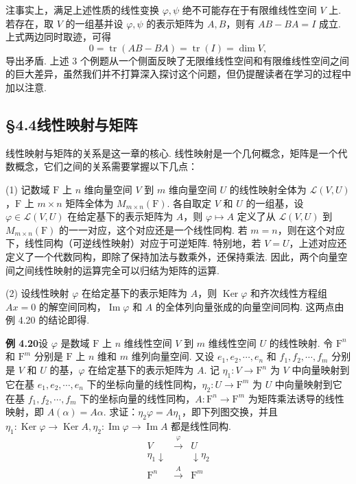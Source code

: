 \documentclass[UTF8,12pt,a4paper,fontset=fandol]{ctexart}
\begin{document}
注\quad 事实上，满足上述性质的线性变换 $\varphi,\psi$ 绝不可能存在于有限维线性空间 $V$ 上. 若存在，取 $V$ 的一组基并设 $\varphi,\psi$ 的表示矩阵为 $A,B$，则有 $AB-BA=I$ 成立. 上式两边同时取迹，可得
\[
0=\operatorname{tr}(AB-BA)=\operatorname{tr}(I)=\dim V,
\]
导出矛盾. 上述 3 个例题从一个侧面反映了无限维线性空间和有限维线性空间之间的巨大差异，虽然我们并不打算深入探讨这个问题，但仍提醒读者在学习的过程中加以注意.

\subsection*{§4.4\quad 线性映射与矩阵}

线性映射与矩阵的关系是这一章的核心. 线性映射是一个几何概念，矩阵是一个代数概念，它们之间的关系需要掌握以下几点：

(1) 记数域 $\mathrm{F}$ 上 $n$ 维向量空间 $V$ 到 $m$ 维向量空间 $U$ 的线性映射全体为 $\mathcal{L}(V,U)$，$\mathrm{F}$ 上 $m\times n$ 矩阵全体为 $M_{m\times n}(\mathrm{F})$. 各自取定 $V$ 和 $U$ 的一组基，设 $\varphi\in\mathcal{L}(V,U)$ 在给定基下的表示矩阵为 $A$，则 $\varphi\mapsto A$ 定义了从 $\mathcal{L}(V,U)$ 到 $M_{m\times n}(\mathrm{F})$ 的一一对应，这个对应还是一个线性同构. 若 $m=n$，则在这个对应下，线性同构（可逆线性映射）对应于可逆矩阵. 特别地，若 $V=U$，上述对应还定义了一个代数同构，即除了保持加法与数乘外，还保持乘法. 因此，两个向量空间之间线性映射的运算完全可以归结为矩阵的运算.

(2) 设线性映射 $\varphi$ 在给定基下的表示矩阵为 $A$，则 $\operatorname{Ker}\varphi$ 和齐次线性方程组 $Ax=0$ 的解空间同构，$\operatorname{Im}\varphi$ 和 $A$ 的全体列向量张成的向量空间同构. 这两点由例 4.20 的结论即得.

\noindent\textbf{例 4.20}\quad 设 $\varphi$ 是数域 $\mathrm{F}$ 上 $n$ 维线性空间 $V$ 到 $m$ 维线性空间 $U$ 的线性映射. 令 $\mathrm{F}^n$ 和 $\mathrm{F}^m$ 分别是 $\mathrm{F}$ 上 $n$ 维和 $m$ 维列向量空间. 又设 $e_1,e_2,\cdots,e_n$ 和 $f_1,f_2,\cdots,f_m$ 分别是 $V$ 和 $U$ 的基，$\varphi$ 在给定基下的表示矩阵为 $A$. 记 $\eta_1:V\to\mathrm{F}^n$ 为 $V$ 中向量映射到它在基 $e_1,e_2,\cdots,e_n$ 下的坐标向量的线性同构，$\eta_2:U\to\mathrm{F}^m$ 为 $U$ 中向量映射到它在基 $f_1,f_2,\cdots,f_m$ 下的坐标向量的线性同构，$A:\mathrm{F}^n\to\mathrm{F}^m$ 为矩阵乘法诱导的线性映射，即 $A(\alpha)=A\alpha$. 求证：$\eta_2\varphi=A\eta_1$，即下列图交换，并且 $\eta_1:\operatorname{Ker}\varphi\to\operatorname{Ker}A,\eta_2:\operatorname{Im}\varphi\to\operatorname{Im}A$ 都是线性同构.
\[
\begin{array}{ccc}
V & \xrightarrow{\varphi} & U\\
\eta_1\downarrow & & \downarrow\eta_2\\
\mathrm{F}^n & \xrightarrow{A} & \mathrm{F}^m
\end{array}
\]
\end{document}
